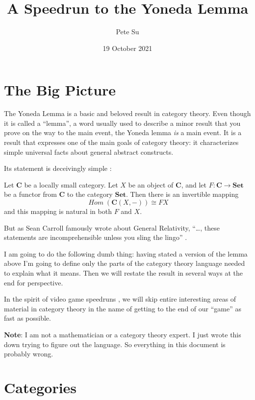 \documentclass[12pt]{article}
\theoremstyle{definition}
\theoremstyle{definition}
\theoremstyle{definition}
\numberwithin{equation}{section}
\newcommand{\cat}[1]{\mathbf{#1}}      %
\newcommand{\fcat}[1]{{\mathbf {#1}}}    %
\newcommand{\CC}{\cat{C}}
\DeclareMathOperator{\Hom}{\mathit{Hom}}
\newcommand{\Set}{\fcat{Set}}           %
\newcommand{\iso}{\cong}                %
\def\pg{\bigskip\goodbreak
\ni}
\def\ni{\goodbreak\noindent}
\begin{document}
\title{\Large A Speedrun to the Yoneda Lemma}
\author{\large Pete Su}
\date{\large 19 October 2021}

\maketitle


\section{The Big Picture}

The Yoneda Lemma is a basic and beloved result in category theory. Even though it is called
a ``lemma'', a word usually used to describe a minor result that you prove on the way
to the main event, the Yoneda lemma {\it is} a main event. It is a result that expresses
one of the main goals of category theory: it characterizes simple universal facts
about general abstract constructs.

Its statement is deceivingly simple \cite{Rhiel2016}:

\pg
Let $\CC$ be a locally small category. Let $X$ be an
object of $\CC$, and let $F: \CC \to \Set$ be a functor from $\CC$ to the category $\Set$.
Then there is an invertible mapping
$$
\Hom(\CC(X, -)) \iso FX
$$
and this mapping is natural in both $F$ and $X$.

\pg
But as Sean Carroll famously wrote about General Relativity, ``\dots, 
these statements are incomprehensible unless you sling the lingo'' \cite{carroll}.

I am going to do the following dumb thing: having stated a version of the lemma above
I'm going to define only the parts of the category theory language 
needed to explain what it means.
Then we will restate the result in several ways at the end for perspective.

In the spirit of video game speedruns \cite{lobos},
we will skip entire interesting areas of material in category theory in the name of
getting to the end of our ``game'' as fast as possible.

\pg
{\bf Note}: I am not a mathematician or a category theory expert. I just wrote this
down trying to figure out the language.
So everything in this document is probably wrong.

\goodbreak
\section{Categories}
\end{document}
